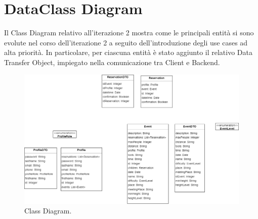 \section{DataClass Diagram} 
Il Class Diagram relativo all'iterazione 2 mostra come le principali entità si sono evolute nel corso dell'iterazione 2 a seguito dell'introduzione
degli use cases ad alta priorità.
In particolare, per ciascuna entità è stato aggiunto il relativo Data Transfer Object, impiegato nella comunicazione tra Client e Backend.
\begin{figure}[h!]
	\centering
	\includegraphics[width=0.8\linewidth]{diagrams/class.drawio.png}
	\caption{Class Diagram.}
	\label{fig:ClassDiagram}
\end{figure}
